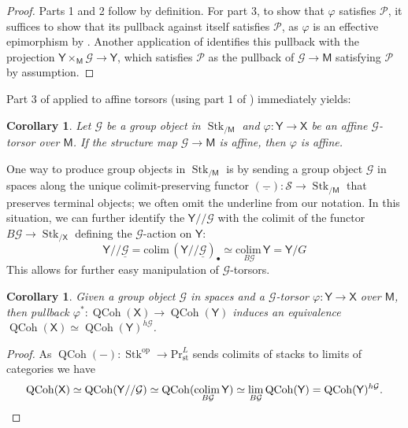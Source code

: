 \documentclass[11pt, a4paper]{article}
\newcommand{\st}{\mathrm{st}}
\newcommand{\1}{\mathbf{1}}
\newcommand{\PrLst}{{\mathrm{Pr}^L_\st}}
\DeclareMathOperator{\QCoh}{QCoh}
\DeclareMathOperator{\Stk}{Stk}
\newcommand{\Spc}{\mathcal{S}}
\newcommand{\colim}{\mathrm{colim}\,}
\newcommand{\op}{\mathrm{op}}
\newcommand{\calG}{\mathcal{G}}
\newcommand{\M}{\mathsf{M}}
\newcommand{\calP}{\mathcal{P}}
\newcommand{\X}{\mathsf{X}}
\newcommand{\Y}{\mathsf{Y}}
\theoremstyle{plain}
\newtheorem{cor}[equation]{Corollary}
\theoremstyle{definition}
\theoremstyle{remark}\numberwithin{equation}{section}
\begin{document}
\begin{proof}
    Parts 1 and 2 follow by definition. For part 3, to show that $\varphi$ satisfies $\calP$, it suffices to show that its pullback against itself satisfies $\calP$, as $\varphi$ is an effective epimorphism by . Another application of  identifies this pullback with the projection $\Y\times_\M \calG \to \Y$, which satisfies $\calP$ as the pullback of $\calG \to \M$ satisfying $\calP$ by assumption.
\end{proof}

Part 3 of  applied to affine torsors (using part 1 of ) immediately yields:

\begin{cor}\label{pr:torsors_are_relatively_affine}
    Let $\calG$ be a group object in $\Stk_{/\M}$ and $\varphi \colon \Y \to \X$ be an affine $\calG$-torsor over $\M$. If the structure map $\calG \to \M$ is affine, then $\varphi$ is affine.
\end{cor}

One way to produce group objects in $\Stk_{/\M}$ is by sending a group object $\calG$ in spaces along the unique colimit-preserving functor $(\underline{-}) \colon \Spc \to \Stk_{/\M}$ that preserves terminal objects; we often omit the underline from our notation. In this situation, we can further identify the $\Y//\calG$ with the colimit of the functor $B\calG \to \Stk_{/\X}$ defining the $\calG$-action on $\Y$:
\[\Y // \underline{\calG} = \colim (\Y//\underline{\calG})_\bullet \simeq \underset{B\calG}{\colim} \Y = \Y/G\]
This allows for further easy manipulation of $\calG$-torsors.

\begin{cor}\label{cor:qcoh_and_fixedpoints}
    Given a group object $\calG$ in spaces and a $\calG$-torsor $\varphi\colon \Y \to \X$ over $\M$, then pullback $\varphi^\ast \colon \QCoh(\X) \to \QCoh(\Y)$ induces an equivalence $\QCoh(\X) \simeq \QCoh(\Y)^{h\calG}$.
\end{cor}

\begin{proof}
    As $\QCoh(-)\colon \Stk^\op \to \PrLst$ sends colimits of stacks to limits of categories we have
    \[\QCoh(\X) \simeq \QCoh(\Y//\calG) \simeq \QCoh(\underset{B\calG}{\colim} \Y) \simeq \lim_{B\calG} \QCoh(\Y) = \QCoh(\Y)^{h\calG}.\qedhere\]
\end{proof}
\end{document}
